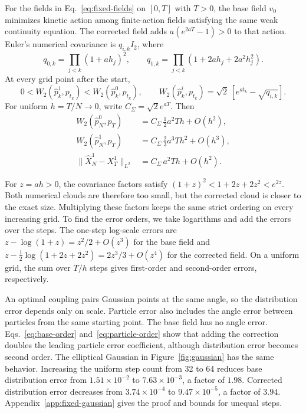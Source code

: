 \begin{theorem}
\label{thm:fixed-gaussian}
For the fields in Eq.~\eqref{eq:fixed-fields} on $[0,T]$ with $T>0$, the base field $v_0$ minimizes kinetic action among finite-action fields satisfying the same weak continuity equation. The corrected field adds $a(e^{2aT}-1)>0$ to that action. Euler's numerical covariance is $q_{i,k}I_2$, where
\begin{equation}
 q_{0,k}=\prod_{j<k}(1+ah_j)^2,\qquad
 q_{1,k}=\prod_{j<k}(1+2ah_j+2a^2h_j^2).
 \label{eq:fixed-covariance}
\end{equation}
At every grid point after the start,
\begin{equation}
 0<W_2(\widehat p_k^1,p_{t_k})
   <W_2(\widehat p_k^0,p_{t_k}),\qquad
 W_2(\widehat p_k^i,p_{t_k})
 =\sqrt{2}\,[e^{at_k}-\sqrt{q_{i,k}}].
 \label{eq:fixed-error}
\end{equation}
For uniform $h=T/N\to0$, write $C_\Sigma=\sqrt{2}e^{aT}$. Then
\begin{align}
 W_2(\widehat p_N^0,p_T)&=C_\Sigma\,\tfrac12a^2T h+O(h^2),
 \label{eq:base-order}\\
 W_2(\widehat p_N^1,p_T)&=C_\Sigma\,\tfrac23a^3T h^2+O(h^3),
 \label{eq:fixed-order}\\
 \|\widehat X_N^1-X_T^1\|_{L^2}
 &=C_\Sigma\,a^2T h+O(h^2).
 \label{eq:particle-order}
\end{align}
\end{theorem}

For $z=ah>0$, the covariance factors satisfy $(1+z)^2<1+2z+2z^2<e^{2z}$. Both numerical clouds are therefore too small, but the corrected cloud is closer to the exact size. Multiplying these factors keeps the same strict ordering on every increasing grid. To find the error orders, we take logarithms and add the errors over the steps. The one-step log-scale errors are $z-\log(1+z)=z^2/2+O(z^3)$ for the base field and $z-\frac12\log(1+2z+2z^2)=2z^3/3+O(z^4)$ for the corrected field. On a uniform grid, the sum over $T/h$ steps gives first-order and second-order errors, respectively.


An optimal coupling pairs Gaussian points at the same angle, so the distribution error depends only on scale. Particle error also includes the angle error between particles from the same starting point. The base field has no angle error. Eqs.~\eqref{eq:base-order} and~\eqref{eq:particle-order} show that adding the correction doubles the leading particle error coefficient, although distribution error becomes second order. The elliptical Gaussian in Figure~\ref{fig:gaussian} has the same behavior. Increasing the uniform step count from 32 to 64 reduces base distribution error from $1.51\times10^{-2}$ to $7.63\times10^{-3}$, a factor of $1.98$. Corrected distribution error decreases from $3.74\times10^{-4}$ to $9.47\times10^{-5}$, a factor of $3.94$. Appendix~\ref{app:fixed-gaussian} gives the proof and bounds for unequal steps.

